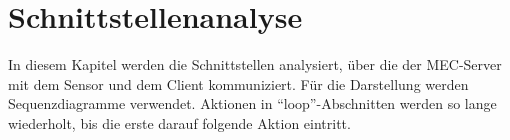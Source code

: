 %		
%		
%		


\section{Schnittstellenanalyse}

In diesem Kapitel werden die Schnittstellen analysiert, über die der MEC-Server mit dem Sensor und dem Client kommuniziert.
Für die Darstellung werden Sequenzdiagramme verwendet.
Aktionen in \enquote{loop}-Abschnitten werden so lange wiederholt, bis die erste darauf folgende Aktion eintritt.

